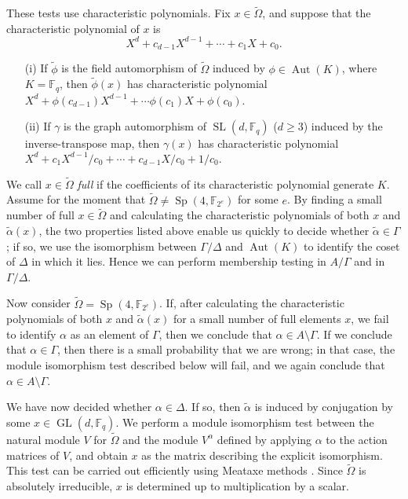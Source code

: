\documentclass[12pt,twoside,reqno,psamsfonts]{amsproc}
\numberwithin{equation}{section}
\numberwithin{figure}{section}
\theoremstyle{plain}
\theoremstyle{definition}
\theoremstyle{remark}
\newcommand{\field}[1]{\mathbb{#1}}
\newcommand{\F}{\field{F}}
\DeclareMathOperator{\GL}{GL}
\DeclareMathOperator{\SL}{SL}
\DeclareMathOperator{\Sp}{Sp}
\DeclareMathOperator{\Aut}{Aut}
\begin{document}
\vspace{0.1cm}
These tests use characteristic polynomials.
Fix $x \in \widetilde{\Omega}$, and suppose that
the characteristic polynomial of $x$ is
$$X^d + c_{d-1}X^{d-1} + \cdots + c_1 X + c_0.$$
\begin{enumerate}
\item[(i)] If $\tilde{\phi}$ is the field automorphism of 
$\widetilde{\Omega}$
induced by $\phi \in \Aut(K)$, where $K = \F_{q}$,
then $\tilde{\phi}(x)$ has characteristic polynomial
$X^d + \phi(c_{d-1})X^{d-1} + \cdots \phi(c_1) X + \phi(c_0)$.
\item[(ii)] If $\gamma$ is the graph automorphism of
$\SL(d,\F_q)$ ($d \ge 3$) induced by the inverse-transpose map, then
$\gamma(x)$ has characteristic polynomial
$X^d + c_1X^{d-1}/c_0 + \cdots + c_{d-1}X/c_0 + 1/c_0.$  
\end{enumerate}
We call $x \in \widetilde{\Omega}$ {\em full} if the coefficients
of its characteristic polynomial generate $K$.
Assume for the moment that $\widetilde{\Omega} \not= \Sp(4,\F_{2^e})$ for some
$e$.  By finding a small number of full $x \in \widetilde{\Omega}$
and calculating the characteristic
polynomials of both $x$ and $\tilde{\alpha}(x)$, the two properties listed above
enable us quickly to decide whether $\tilde{\alpha} \in \Gamma$;
if so, we use the isomorphism between $\Gamma/\Delta$ and $\Aut(K)$ to identify
the coset of $\Delta$ in which it lies.
Hence we can perform membership testing
in $A/\Gamma$ and in $\Gamma/\Delta$.

Now consider $\widetilde{\Omega} = \Sp(4,\F_{2^e})$.
If, after calculating
the characteristic polynomials of both $x$ and $\tilde{\alpha}(x)$ for a
small number of full elements $x$, we fail to identify $\alpha$ as an element
of $\Gamma$, then we conclude that $\alpha \in A \setminus \Gamma$. 
If we conclude that $\alpha \in \Gamma$, then there is a 
small probability that we are wrong; in that case, the module isomorphism test
described below will fail, and we again conclude that 
$\alpha \in A \setminus \Gamma$.

\vspace{0.1cm}
We have now decided whether $\alpha \in \Delta$.
If so, then $\tilde{\alpha}$
is induced by conjugation by some $x \in \GL(d,\F_{q})$. 
We perform a module isomorphism test between
the natural module $V$ for $\widetilde{\Omega}$ and the module $V^{\alpha}$
defined by applying $\alpha$ to the action matrices of $V$, and 
obtain $x$ as the matrix describing the explicit isomorphism.
This test can be carried out efficiently using 
{\sc Meataxe} methods \cite[\S 7.5.3]{hcgt}.
Since $\widetilde{\Omega}$ is absolutely irreducible, 
$x$ is determined up to multiplication by a scalar.
\end{document}
